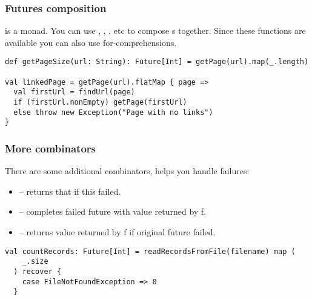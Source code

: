 \begin{frame}[fragile]
\frametitle{Futures composition}
 is a monad. You can use , , , etc to
compose s together. Since these functions are available you can also use for-comprehensions.
\begin{lstlisting}
def getPageSize(url: String): Future[Int] = getPage(url).map(_.length)

val linkedPage = getPage(url).flatMap { page =>
  val firstUrl = findUrl(page)
  if (firstUrl.nonEmpty) getPage(firstUrl)
  else throw new Exception("Page with no links")
}
\end{lstlisting}
\end{frame}

\begin{frame}[fragile]
\frametitle{More combinators}
There are some additional combinators, helps you handle failures:
\begin{itemize}
\item {} -- returns that if this failed.
\item {} -- completes failed future with value returned by f.
\item {} -- returns value returned by f if original future failed.
\end{itemize}
\begin{example}
\begin{lstlisting}
val countRecords: Future[Int] = readRecordsFromFile(filename) map (
    _.size
  ) recover {
    case FileNotFoundException => 0
  }
\end{lstlisting}
\end{example}
\end{frame}

